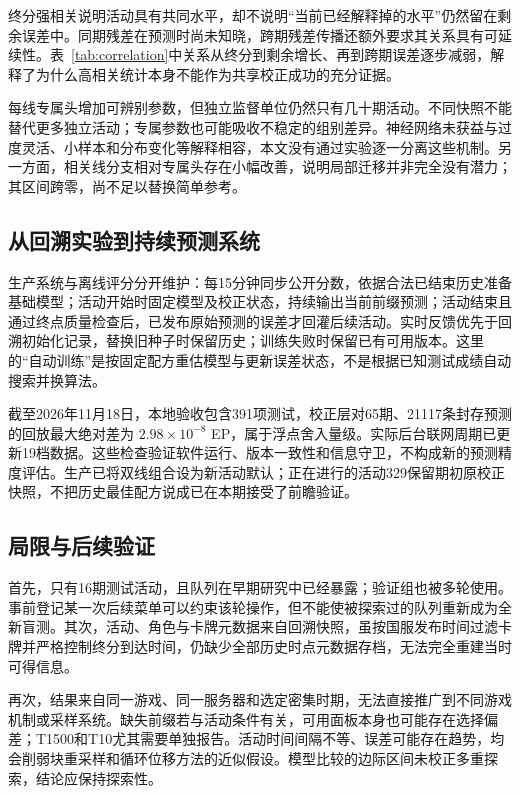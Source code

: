 \documentclass[a4paper,11pt,fontset=none]{ctexart}
\begin{document}
终分强相关说明活动具有共同水平，却不说明``当前已经解释掉的水平''仍然留在剩余误差中。同期残差在预测时尚未知晓，跨期残差传播还额外要求其关系具有可延续性。表~\ref{tab:correlation}中关系从终分到剩余增长、再到跨期误差逐步减弱，解释了为什么高相关统计本身不能作为共享校正成功的充分证据。

每线专属头增加可辨别参数，但独立监督单位仍然只有几十期活动。不同快照不能替代更多独立活动；专属参数也可能吸收不稳定的组别差异。神经网络未获益与过度灵活、小样本和分布变化等解释相容，本文没有通过实验逐一分离这些机制。另一方面，相关线分支相对专属头存在小幅改善，说明局部迁移并非完全没有潜力；其区间跨零，尚不足以替换简单参考。

\subsection{从回溯实验到持续预测系统}

生产系统与离线评分分开维护：每15分钟同步公开分数，依据合法已结束历史准备基础模型；活动开始时固定模型及校正状态，持续输出当前前缀预测；活动结束且通过终点质量检查后，已发布原始预测的误差才回灌后续活动。实时反馈优先于回溯初始化记录，替换旧种子时保留历史；训练失败时保留已有可用版本。这里的``自动训练''是按固定配方重估模型与更新误差状态，不是根据已知测试成绩自动搜索并换算法。

截至2026年11月18日，本地验收包含391项测试，校正层对65期、21117条封存预测的回放最大绝对差为 \(2.98\times10^{-8}\) EP，属于浮点舍入量级。实际后台联网周期已更新19档数据。这些检查验证软件运行、版本一致性和信息守卫，不构成新的预测精度评估。生产已将双线组合设为新活动默认；正在进行的活动329保留期初原校正快照，不把历史最佳配方说成已在本期接受了前瞻验证。

\subsection{局限与后续验证}

首先，只有16期测试活动，且队列在早期研究中已经暴露；验证组也被多轮使用。事前登记某一次后续菜单可以约束该轮操作，但不能使被探索过的队列重新成为全新盲测。其次，活动、角色与卡牌元数据来自回溯快照，虽按国服发布时间过滤卡牌并严格控制终分到达时间，仍缺少全部历史时点元数据存档，无法完全重建当时可得信息。

再次，结果来自同一游戏、同一服务器和选定密集时期，无法直接推广到不同游戏机制或采样系统。缺失前缀若与活动条件有关，可用面板本身也可能存在选择偏差；T1500和T10尤其需要单独报告。活动时间间隔不等、误差可能存在趋势，均会削弱块重采样和循环位移方法的近似假设。模型比较的边际区间未校正多重探索，结论应保持探索性。
\end{document}
